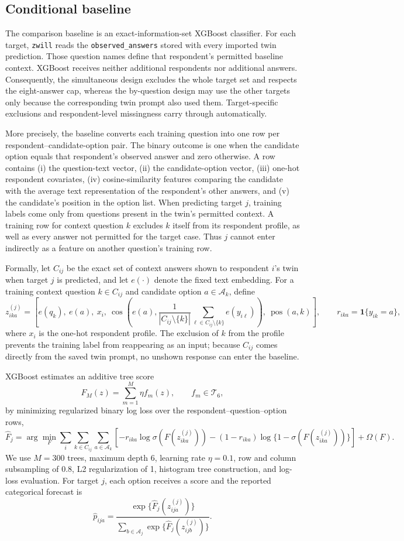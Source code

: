 \documentclass[11pt]{article}
\newcommand{\zwill}{\texttt{zwill}}
\begin{document}
\subsection{Conditional baseline}
The comparison baseline is an exact-information-set XGBoost classifier. For
each target, \zwill{} reads the \texttt{observed\_answers} stored with
every imported twin prediction. Those question names define that respondent's
permitted baseline context. XGBoost receives neither additional respondents
nor additional answers. Consequently, the simultaneous design excludes the
whole target set and respects the eight-answer cap, whereas the by-question
design may use the other targets only because the corresponding twin prompt
also used them. Target-specific exclusions and respondent-level missingness
carry through automatically.

More precisely, the baseline converts each training question into one row per
respondent--candidate-option pair. The binary outcome is one when the candidate
option equals that respondent's observed answer and zero otherwise. A row
contains (i) the question-text vector, (ii) the candidate-option vector,
(iii) one-hot respondent covariates, (iv) cosine-similarity features comparing
the candidate with the average text representation of the respondent's other
answers, and (v) the candidate's position in the option list. When predicting
target $j$, training labels come only from questions present in the twin's
permitted context. A training row for context question $k$ excludes $k$ itself
from its respondent profile, as well as every answer not permitted for the
target case. Thus $j$ cannot enter indirectly as a feature on another
question's training row.

Formally, let $C_{ij}$ be the exact set of context answers shown to respondent
$i$'s twin when target $j$ is predicted, and let $e(\cdot)$ denote the fixed
text embedding.  For a training context question $k\in C_{ij}$ and candidate
option $a\in\mathcal A_k$, define
\[
 z_{ika}^{(j)}=
 \left[
 e(q_k),\ e(a),\ x_i,\
 \cos\!\left(e(a),\frac{1}{|C_{ij}\setminus\{k\}|}
       \sum_{\ell\in C_{ij}\setminus\{k\}}e(y_{i\ell})\right),\
 \operatorname{pos}(a,k)
 \right],
 \qquad
 r_{ika}=\mathbf 1\{y_{ik}=a\},
 \]
where $x_i$ is the one-hot respondent profile. The exclusion of $k$ from the
profile prevents the training label from reappearing as an input; because
$C_{ij}$ comes directly from the saved twin prompt, no unshown response can
enter the baseline.

XGBoost estimates an additive tree score
\[
 F_M(z)=\sum_{m=1}^{M}\eta f_m(z), \qquad f_m\in\mathcal T_6,
\]
by minimizing regularized binary log loss over the respondent--question--option
rows,
\[
 \widehat F_j=\arg\min_F
 \sum_i\sum_{k\in C_{ij}}\sum_{a\in\mathcal A_k}
 \left[-r_{ika}\log\sigma(F(z_{ika}^{(j)}))
 -(1-r_{ika})\log\{1-\sigma(F(z_{ika}^{(j)}))\}\right]
 +\Omega(F).
\]
We use $M=300$ trees, maximum depth 6, learning rate $\eta=0.1$, row and
column subsampling of 0.8, L2 regularization of 1, histogram tree construction,
and log-loss evaluation. For target $j$, each option receives a score and the
reported categorical forecast is
\[
 \widehat p_{ija}=
 \frac{\exp\{\widehat F_j(z_{ija}^{(j)})\}}
      {\sum_{b\in\mathcal A_j}\exp\{\widehat F_j(z_{ijb}^{(j)})\}}.
\]
\end{document}
